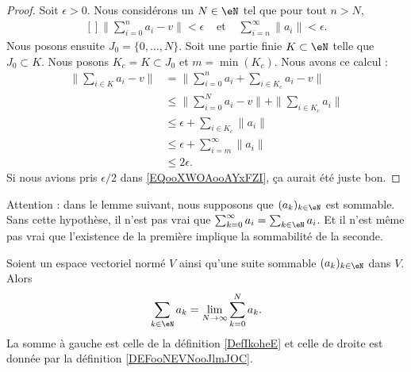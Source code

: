 \begin{proof}
	Soit \( \epsilon>0\). Nous considérons un \( N\in \eN\) tel que pour tout \( n>N\),
	\begin{equation}		\label{EQooXWOAooAYxFZI}
		\begin{aligned}[]
			\| \sum_{i=0}^na_i-v \|<\epsilon & \text{ et } & \sum_{i=n}^{\infty}\| a_i \|<\epsilon.
		\end{aligned}
	\end{equation}
	Nous posons ensuite \( J_0=\{ 0,\ldots,N \}\). Soit une partie finie \( K\subset \eN\) telle que \( J_0\subset K\). Nous posons \( K_c=K\subset J_0\) et \( m=\min(K_c)\). Nous avons ce calcul :
	\begin{subequations}
		\begin{align}
			\| \sum_{i\in K}a_i-v \| & =\| \sum_{i=0}^na_i+\sum_{i\in K_c}a_i-v \|           \\
			                         & \leq \| \sum_{i=0}^Na_i-v \|+\| \sum_{i\in K_c}a_i \| \\
			                         & \leq \epsilon+\sum_{i\in K_c}\| a_i \|                \\
			                         & \leq \epsilon+\sum_{i=m}^{\infty}\| a_i \|            \\
			                         & \leq 2\epsilon.
		\end{align}
	\end{subequations}
	Si nous avions pris \( \epsilon/2\) dans \eqref{EQooXWOAooAYxFZI}, ça aurait été juste bon.
\end{proof}

Attention : dans le lemme suivant, nous supposons que \( (a_k)_{k\in \eN}\) est sommable. Sans cette hypothèse, il n'est pas vrai que \( \sum_{k=0}^{\infty}a_i=\sum_{k\in \eN}a_i\). Et il n'est même pas vrai que l'existence de la première implique la sommabilité de la seconde.

\begin{lemma}       \label{LEMooGXPGooZTJPoN}
	Soient un espace vectoriel normé \( V\) ainsi qu'une suite sommable \( (a_k)_{k\in \eN}\) dans \( V\). Alors
	\begin{equation}		\label{EQooXQWBooLympdN}
		\sum_{k\in \eN}a_k=\lim_{N\to \infty} \sum_{k=0}^N a_k.
	\end{equation}
	La somme à gauche est celle de la définition \ref{DefIkoheE} et celle de droite est donnée par la définition \ref{DEFooNEVNooJlmJOC}.
\end{lemma}

